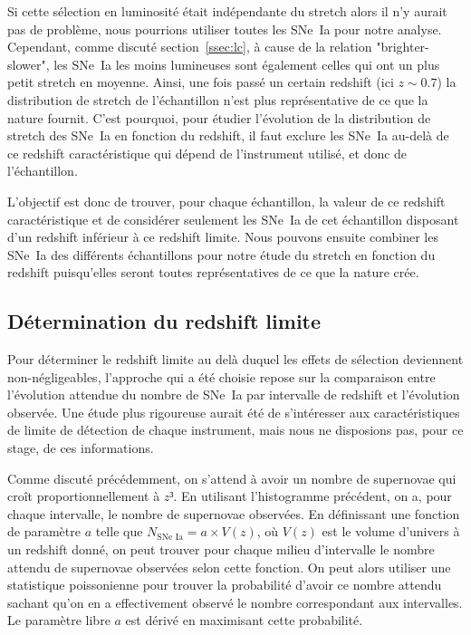 \documentclass[a4paper, 12pt, svgnames]{article}
\begin{document}
Si cette sélection en luminosité était indépendante du stretch alors il n'y
aurait pas de problème, nous pourrions utiliser toutes les SNe~Ia pour notre
analyse. Cependant, comme discuté section~\ref{ssec:lc}, à cause de la relation
"brighter-slower", les SNe~Ia les moins lumineuses sont également celles qui ont
un plus petit stretch en moyenne. Ainsi, une fois passé un certain redshift (ici
$z\sim0.7$) la distribution de stretch de l'échantillon n'est plus
représentative de ce que la nature fournit. C'est pourquoi, pour étudier
l'évolution de la distribution de stretch des SNe~Ia en fonction du redshift, il
faut exclure les SNe~Ia au-delà de ce redshift caractéristique qui dépend de
l'instrument utilisé, et donc de l'échantillon. \bigbreak

L'objectif est donc de trouver, pour chaque échantillon, la valeur de ce
redshift caractéristique et de considérer seulement les SNe~Ia de cet
échantillon disposant d'un redshift inférieur à ce redshift limite. Nous pouvons
ensuite combiner les SNe~Ia des différents échantillons pour notre étude du
stretch en fonction du redshift puisqu'elles seront toutes représentatives de ce
que la nature crée.

\subsection{Détermination du redshift limite}\label{ssec:det}

Pour déterminer le redshift limite au delà duquel les effets de sélection
deviennent non-négligeables, l'approche qui a été choisie repose sur la
comparaison entre l'évolution attendue du nombre de SNe~Ia par intervalle de
redshift et l'évolution observée. Une étude plus rigoureuse aurait été de
s'intéresser aux caractéristiques de limite de détection de chaque instrument,
mais nous ne disposions pas, pour ce stage, de ces informations. \bigbreak

Comme discuté précédemment, on s'attend à avoir un nombre de supernovae qui
croît proportionnellement à $z³$. En utilisant l'histogramme précédent, on a,
pour chaque intervalle, le nombre de supernovae observées. En définissant une
fonction de paramètre $a$ telle que $N_{\text{SNe~Ia}} = a\times V(z)$, où
$V(z)$ est le volume d'univers à un redshift donné, on peut trouver pour chaque
milieu d'intervalle le nombre attendu de supernovae observées selon cette
fonction. On peut alors utiliser une statistique poissonienne pour trouver la
probabilité d'avoir ce nombre attendu sachant qu'on en a effectivement observé
le nombre correspondant aux intervalles. Le paramètre libre $a$ est dérivé
en maximisant cette probabilité. \bigbreak
\end{document}

